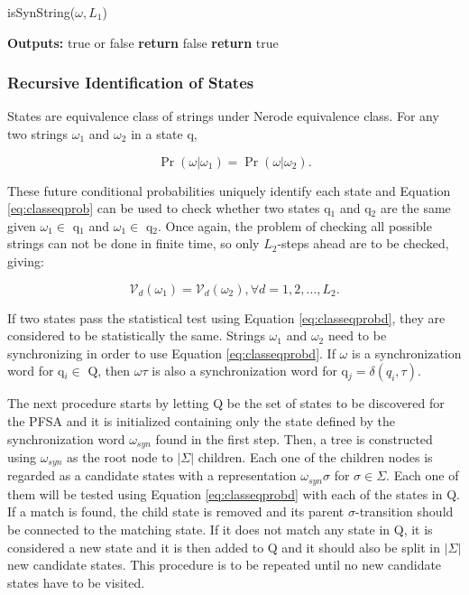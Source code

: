{\begin{algorithm}
\caption{isSynString($\omega, L_1$)\label{alg:issynstring}}
	\begin{algorithmic}[1]
	\State \textbf{Outputs:} true or false
				\State \textbf{return} false
			\EndIf
		\EndFor
	\EndFor
	\State \textbf{return} true
	\end{algorithmic}
\end{algorithm}

\subsubsection{Recursive Identification of States}

States are equivalence class of strings under Nerode equivalence class. For any two strings $\omega_1$ and $\omega_2$ in a state q,

\begin{equation}\label{eq:classeqprob}
\Pr(\omega|\omega_1) = \Pr(\omega|\omega_2).
\end{equation}

These future conditional probabilities uniquely identify each state and Equation \ref{eq:classeqprob} can be used to check whether two states q$_1$ and q$_2$ are the same given $\omega_1\in$ q$_1$ and $\omega_1\in$ q$_2$. Once again, the problem of checking all possible strings can not be done in finite time, so only $L_2$-steps ahead are to be checked, giving:

\begin{equation}\label{eq:classeqprobd}
\mathcal{V}_d(\omega_1) = \mathcal{V}_d(\omega_2), \forall d = 1,2,\ldots,L_2.
\end{equation}

If two states pass the statistical test using Equation \ref{eq:classeqprobd}, they are considered to be statistically the same. Strings $\omega_1$ and $\omega_2$ need to be synchronizing in order to use Equation \ref{eq:classeqprobd}. If $\omega$ is a synchronization word for q$_i \in$ Q, then $\omega\tau$ is also a synchronization word for q$_j = \delta(q_i,\tau)$.

The next procedure starts by letting Q be the set of states to be discovered for the PFSA and it is initialized containing only the state defined by the synchronization word $\omega_{syn}$ found in the first step. Then, a tree is constructed using $\omega_{syn}$ as the root node to $|\Sigma|$ children. Each one of the children nodes is regarded as a candidate states with a representation $\omega_{syn}\sigma$ for $\sigma\in\Sigma$. Each one of them will be tested using Equation \ref{eq:classeqprobd} with each of the states in Q. If a match is found, the child state is removed and its parent $\sigma$-transition should be connected to the matching state. If it does not match any state in Q, it is considered a new state and it is then added to Q and it should also be split in $|\Sigma|$ new candidate states. This procedure is to be repeated until no new candidate states have to be visited.

}
